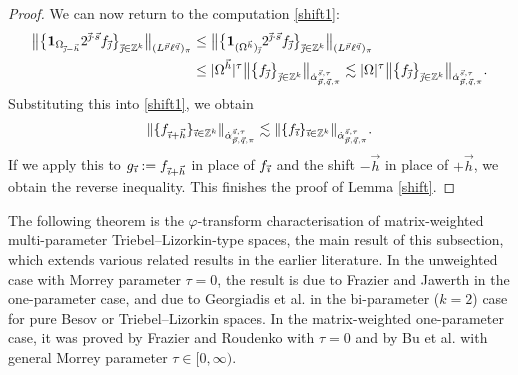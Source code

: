 \documentclass[11pt, reqno]{amsart}
\theoremstyle{definition}
\theoremstyle{remark}
\numberwithin{equation}{section}
\newcommand{\Z}{\mathbb Z}
\newcommand{\vh}{\vec h}
\newcommand{\vi}{\vec{\textit{\i}}}
\newcommand{\vj}{\vec{\textit{\j}}}
\newcommand{\vp}{\vec p}
\newcommand{\vq}{\vec q}
\newcommand{\vs}{\vec s}
\newcommand{\aatau}{\dot{\alpha}^{\vs,\tau}_{\vp,\vq,\pi}}
\newcommand{\one}{\mathbf{1}}
\newcommand{\abs}[1]{|#1|}
\newcommand{\Norm}[2]{\|#1\|_{#2}}
\newcommand{\bNorm}[2]{\big\|#1\big\|_{#2}}
\begin{document}
\begin{proof}
We can now return to the computation \eqref{shift1}:
\begin{equation*}
\begin{split}
\bNorm{\big\{\one_{\Omega_{\vj-\vh}}2^{\vj\cdot\vs}f_{\vj}\big\}_{\vj\in\Z^k}}{(L^{\vp}\ell^{\vq})_\pi}
&\leq\bNorm{\big\{\one_{(\Omega^{\vh})_{\vj}}2^{\vj\cdot\vs}f_{\vj}\big\}_{\vj\in\Z^k}}
{(L^{\vp}\ell^{\vq})_\pi} \\
&\leq\abs{\Omega^{\vh}}^{\tau}\bNorm{\big\{f_{\vj}\big\}_{\vj\in\Z^k}}{\aatau}
\lesssim\abs{\Omega}^{\tau}\bNorm{\big\{f_{\vj}\big\}_{\vj\in\Z^k}}{\aatau}.
\end{split}
\end{equation*}
Substituting this into \eqref{shift1}, we obtain
\begin{equation*}
\Norm{\{f_{\vi+\vh}\}_{\vi\in\Z^k}}{\aatau}
\lesssim\Norm{\{f_{\vi}\}_{\vi\in\Z^k}}{\aatau}.
\end{equation*}
If we apply this to $g_{\vi}:=f_{\vi+\vh}$ in place of $f_{\vi}$ and the shift $-\vh$ in place of $+\vh$, we obtain the reverse inequality.
This finishes the proof of Lemma \ref{shift}.
\end{proof}

The following theorem is the $\varphi$-transform characterisation of matrix-weighted multi-parameter Triebel--Lizorkin-type spaces, the main result of this subsection, which extends various related results in the earlier literature. In the unweighted case with Morrey parameter $\tau=0$, the result is due to Frazier and Jawerth \cite[Theorem 2.2]{FJ90} in the one-parameter case, and due to Georgiadis et al. \cite[Theorem 4.2]{GKP21} in the bi-parameter ($k=2$) case for pure Besov or Triebel--Lizorkin spaces.
In the matrix-weighted one-parameter case, it was proved by Frazier and Roudenko \cite[Theorem 1.1]{FR21} with $\tau=0$ and by Bu et al. \cite[Theorem 3.29]{BHYY:1a} with general Morrey parameter $\tau\in[0,\infty)$.
\end{document}
